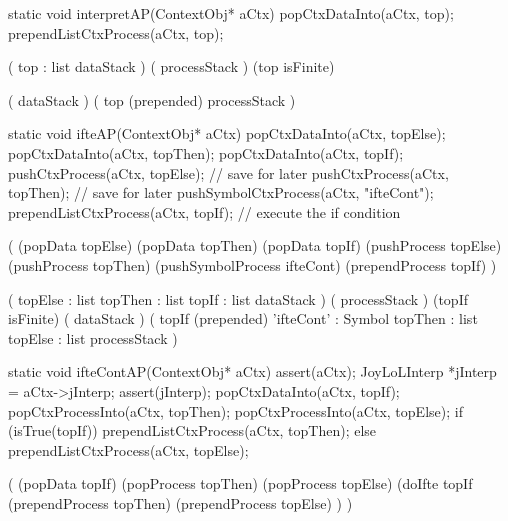 \stoptyping

\startCCode
static void interpretAP(ContextObj* aCtx) {
  popCtxDataInto(aCtx, top);
  prependListCtxProcess(aCtx, top);
}
\stopCCode

\starttyping

\startWord[interpret]

\preDataStack
  (
    top : list
    dataStack
  )
\preProcessStack
  (
    processStack
  )
\preConditions
  (top isFinite)
\stopPreStack

\postDataStack
  (
    dataStack
  )
\postProcessStack
  (
    top (prepended)
    processStack
  )
\postConditions
\stopPostStack

\stopWord

\stoptyping

\startJoyLoLWord[ifte]

\startCCode
static void ifteAP(ContextObj* aCtx) {
  popCtxDataInto(aCtx, topElse);
  popCtxDataInto(aCtx, topThen);
  popCtxDataInto(aCtx, topIf);
  pushCtxProcess(aCtx, topElse); // save for later
  pushCtxProcess(aCtx, topThen); // save for later
  pushSymbolCtxProcess(aCtx, "ifteCont");
  prependListCtxProcess(aCtx, topIf); // execute the if condition
}
\stopCCode

\startImplementation[ansic]
  (
    (popData topElse)
    (popData topThen)
    (popData topIf)
    (pushProcess topElse)
    (pushProcess topThen)
    (pushSymbolProcess ifteCont)
    (prependProcess topIf)
  )
\stopImplementation

\startRule[ifte]
\preDataStack
  (
    topElse : list
    topThen : list
    topIf   : list
    dataStack
  )
\preProcessStack
  (
    processStack
  )
\preConditions
  (topIf isFinite)
\postDataStack
  (
    dataStack
  )
\postProcessStack
  (
    topIf (prepended)
    'ifteCont' : Symbol
    topThen    : list
    topElse    : list
    processStack
  )
\postConditions
\stopRule

\stopJoyLoLWord

\startJoyLoLWord[ifteCont]

\startCCode
static void ifteContAP(ContextObj* aCtx) {
  assert(aCtx);
  JoyLoLInterp *jInterp = aCtx->jInterp;
  assert(jInterp);
  popCtxDataInto(aCtx, topIf);
  popCtxProcessInto(aCtx, topThen);
  popCtxProcessInto(aCtx, topElse);
  if (isTrue(topIf)) {
    prependListCtxProcess(aCtx, topThen);
  } else {
    prependListCtxProcess(aCtx, topElse);
  }
}
\stopCCode

\startImplementation[ansic]
  (
    (popData topIf)
    (popProcess topThen)
    (popProcess topElse)
    (doIfte topIf 
      (prependProcess topThen)
      (prependProcess topElse)
    )
  )
\stopImplementation

